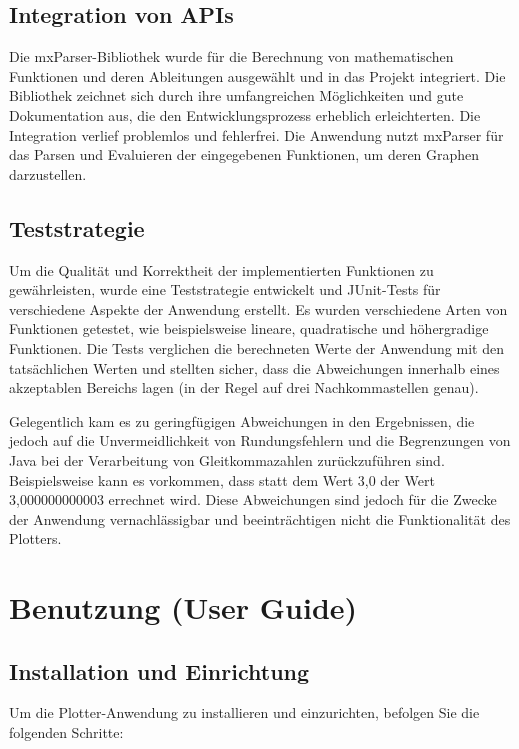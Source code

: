 \documentclass[a4paper]{article}
\begin{document}
\subsection{Integration von APIs}
Die mxParser-Bibliothek wurde für die Berechnung von mathematischen Funktionen und deren Ableitungen ausgewählt und in das Projekt integriert. Die Bibliothek zeichnet sich durch ihre umfangreichen Möglichkeiten und gute Dokumentation aus, die den Entwicklungsprozess erheblich erleichterten. Die Integration verlief problemlos und fehlerfrei. Die Anwendung nutzt mxParser für das Parsen und Evaluieren der eingegebenen Funktionen, um deren Graphen darzustellen.

\subsection{Teststrategie}
Um die Qualität und Korrektheit der implementierten Funktionen zu gewährleisten, wurde eine Teststrategie entwickelt und JUnit-Tests für verschiedene Aspekte der Anwendung erstellt. Es wurden verschiedene Arten von Funktionen getestet, wie beispielsweise lineare, quadratische und höhergradige Funktionen. Die Tests verglichen die berechneten Werte der Anwendung mit den tatsächlichen Werten und stellten sicher, dass die Abweichungen innerhalb eines akzeptablen Bereichs lagen (in der Regel auf drei Nachkommastellen genau).

Gelegentlich kam es zu geringfügigen Abweichungen in den Ergebnissen, die jedoch auf die Unvermeidlichkeit von Rundungsfehlern und die Begrenzungen von Java bei der Verarbeitung von Gleitkommazahlen zurückzuführen sind. Beispielsweise kann es vorkommen, dass statt dem Wert 3,0 der Wert 3,000000000003 errechnet wird. Diese Abweichungen sind jedoch für die Zwecke der Anwendung vernachlässigbar und beeinträchtigen nicht die Funktionalität des Plotters.

\newpage

\section{Benutzung (User Guide)}

\subsection{Installation und Einrichtung}
Um die Plotter-Anwendung zu installieren und einzurichten, befolgen Sie die folgenden Schritte:
\end{document}
